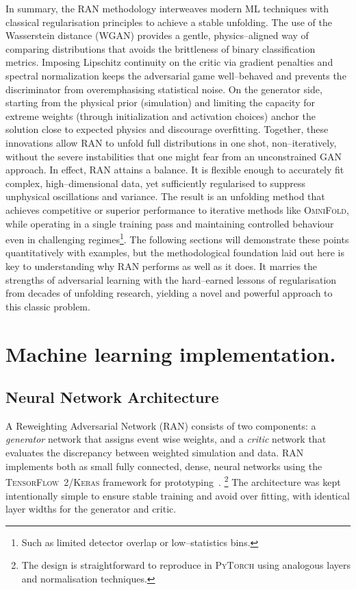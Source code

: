 {{    In summary, the RAN methodology interweaves modern ML techniques with classical regularisation principles to achieve a stable unfolding.
    The use of the Wasserstein distance (WGAN) provides a gentle, physics--aligned way of comparing distributions that avoids the brittleness of binary classification metrics.
     Imposing Lipschitz continuity on the critic via gradient penalties and spectral normalization keeps the adversarial game well--behaved and prevents the discriminator from overemphasising statistical noise.
    On the generator side, starting from the physical prior (simulation) and limiting the capacity for extreme weights (through initialization and activation choices) anchor the solution close to expected physics and discourage overfitting.
    Together, these innovations allow RAN to unfold full distributions in one shot, non--iteratively, without the severe instabilities that one might fear from an unconstrained GAN approach.
    In effect, RAN attains a balance.
    It is flexible enough to accurately fit complex, high--dimensional data, yet sufficiently regularised to suppress unphysical oscillations and variance.
    The result is an unfolding method that achieves competitive or superior performance to iterative methods like \textsc{OmniFold}, while operating in a single training pass and maintaining controlled behaviour even in challenging regimes\footnote{Such as limited detector overlap or low--statistics bins.}.
    The following sections will demonstrate these points quantitatively with examples, but the methodological foundation laid out here is key to understanding why RAN performs as well as it does.
    It marries the strengths of adversarial learning with the hard--earned lessons of regularisation from decades of unfolding research, yielding a novel and powerful approach to this classic problem.
\section{Machine learning implementation.}
\label{sec:ran-ml-implementation}
    \subsection{Neural Network Architecture}
        A Reweighting Adversarial Network (RAN) consists of two components: a \emph{generator} network that assigns event wise weights, and a \emph{critic} network that evaluates the discrepancy between weighted simulation and data.
        RAN implements both as small fully connected, dense, neural networks using the \textsc{TensorFlow~2/Keras} framework for prototyping~\cite{Abadi2016TensorFlow:Learning, chollet2015keras}.
        \footnote{The design is straightforward to reproduce in \textsc{PyTorch} using analogous layers and normalisation techniques.}
        The architecture was kept intentionally simple to ensure stable training and avoid over fitting, with identical layer widths for the generator and critic.

}}
